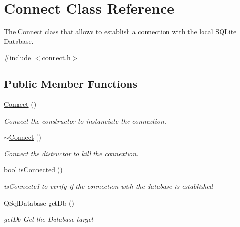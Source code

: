 \hypertarget{class_connect}{}\section{Connect Class Reference}
\label{class_connect}


The \mbox{\hyperlink{class_connect}{Connect}} class that allows to establish a connection with the local S\+Q\+Lite Database.  




{\ttfamily \#include $<$connect.\+h$>$}

\subsection*{Public Member Functions}
\begin{DoxyCompactItemize}
\item 
\mbox{\label{class_connect_a97b4db946695c6ccf54d740a07b63f98}} 
\mbox{\hyperlink{class_connect_a97b4db946695c6ccf54d740a07b63f98}{Connect}} ()
\begin{DoxyCompactList}\small\item\em \mbox{\hyperlink{class_connect}{Connect}} the constructor to instanciate the connextion. \end{DoxyCompactList}\item 
\mbox{\label{class_connect_afb94d6b498a514a024a5b3d7700c91a8}} 
\mbox{\hyperlink{class_connect_afb94d6b498a514a024a5b3d7700c91a8}{$\sim$\+Connect}} ()
\begin{DoxyCompactList}\small\item\em \mbox{\hyperlink{class_connect}{Connect}} the distructor to kill the connextion. \end{DoxyCompactList}\item 
bool \mbox{\hyperlink{class_connect_a374f62961fb30b572ea90c43c53d009e}{is\+Connected}} ()
\begin{DoxyCompactList}\small\item\em is\+Connected to verify if the connection with the database is established \end{DoxyCompactList}\item 
Q\+Sql\+Database \mbox{\hyperlink{class_connect_af2e8a4e537c025a0eb058803919728b0}{get\+Db}} ()
\begin{DoxyCompactList}\small\item\em get\+Db Get the Database target \end{DoxyCompactList}\end{DoxyCompactItemize}


